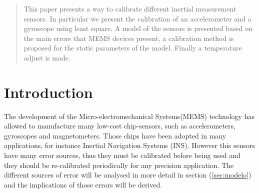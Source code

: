 \documentclass[conference]{IEEEtran}
\newcommand{\refp}[1]{(\ref{#1})}
\begin{document}




\maketitle


\begin{abstract}
This paper presents a way to calibrate different inertial measurement sensors. In particular we present the calibration of an accelerometer and a gyroscope using least square. A model of the sensors is presented based on the main errors that MEMS devices present, a calibration method is proposed for the static parameters of the model. Finally a temperature adjust is made.  
\end{abstract}





%
\IEEEpeerreviewmaketitle

\section{Introduction}
The development of the Micro-electromechanical Systems(MEMS) technology has allowed to manufacture many low-cost chip-sensors, such as accelerometers, gyroscopes and magnetometers. Those chips have been adopted in many applications, for instance Inertial Navigation Systems (INS)\cite{bib:paper}. However this sensors have many error sources, thus they must be calibrated before being used and they should be re-calibrated periodically for any precision application. The different sources of error will be analysed in more detail in section \refp{sec:modelo} and the implications of those errors will be derived.\\ 
\end{document}
